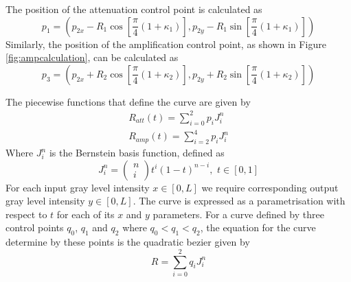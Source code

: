 \documentclass[a4paper,11pt]{ijamas}
\begin{document}
The position of the attenuation control point is calculated as
\begin{equation*}
{p_1} = \left(
		p_{2x} - R_1\cos[\frac{\pi}{4}(1+\kappa_1)],
		p_{2y} - R_1\sin[\frac{\pi}{4}(1+\kappa_1)]
		\right)
\end{equation*}
Similarly, the position of the amplification control point, as shown in Figure \ref{fig:ampcalculation}, can be calculated as
\begin{equation*}
{p_3} = \left(
	p_{2x} + R_2\cos[\frac{\pi}{4}(1+\kappa_2)],
	p_{2y} + R_2\sin[\frac{\pi}{4}(1+\kappa_2)]
\right)
\end{equation*}

The piecewise functions that define the curve are given by	
\begin{eqnarray}
	R_{att}(t) = \sum_{i=0}^2 p_i J_i^n \\
	R_{amp}(t) = \sum_{i=2}^4 p_i J_i^n
\end{eqnarray}
Where $J_i^n$ is the Bernstein basis function, defined as
\begin{equation}
	J_i^n = \begin{pmatrix}
				n \\
				i
			\end{pmatrix}	
			t^i(1-t)^{n-i}, \,\, t \in [0,1]
	\label{eq:bernsteinbasis}
\end{equation}
For each input gray level intensity $x \in [0, L]$ we require corresponding output gray level intensity $y \in [0, L]$.
The curve is expressed as a parametrisation with respect to $t$ for each of its $x$ and $y$ parameters.
For a curve defined by three control points $q_0$, $q_1$ and $q_2$ where $q_0 < q_1 < q_2$, the equation for the curve determine by these points is the quadratic bezier given by
\begin{equation}
	R = \sum_{i=0}^2 q_i J_i^n
\end{equation}
\end{document}
